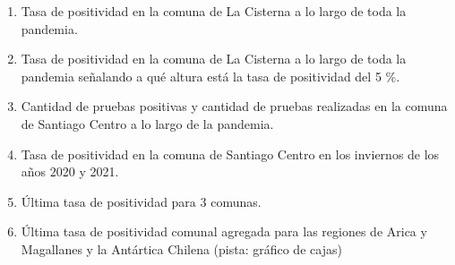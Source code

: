 \documentclass{article}
\begin{document}
\begin{enumerate}
    \item Tasa de positividad en la comuna de La Cisterna a lo largo de toda la pandemia.
    \item Tasa de positividad en la comuna de La Cisterna a lo largo de toda la pandemia señalando a qué altura está la tasa de positividad del 5 \%.
    \item Cantidad de pruebas positivas y cantidad de pruebas realizadas en la comuna de Santiago Centro a lo largo de la pandemia.
    \item Tasa de positividad en la comuna de Santiago Centro en los inviernos de los años 2020 y 2021.
    \item Última tasa de positividad para 3 comunas.
    \item Última tasa de positividad comunal agregada para las regiones de Arica y Magallanes y la Antártica Chilena (pista: gráfico de cajas)
\end{enumerate}
\end{document}
